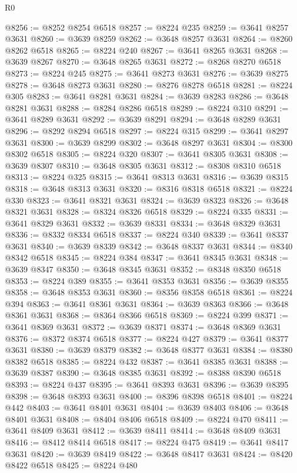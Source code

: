 \begin{lexlean}{R0}
\begin{coremodule}
@8256 := @8252 @8254 @6518
@8257 := @8224 @235
@8259 := @3641 @8257 @3631
@8260 := @3639 @8259
@8262 := @3648 @8257 @3631
@8264 := @8260 @8262 @6518
@8265 := @8224 @240
@8267 := @3641 @8265 @3631
@8268 := @3639 @8267
@8270 := @3648 @8265 @3631
@8272 := @8268 @8270 @6518
@8273 := @8224 @245
@8275 := @3641 @8273 @3631
@8276 := @3639 @8275
@8278 := @3648 @8273 @3631
@8280 := @8276 @8278 @6518
@8281 := @8224 @305
@8283 := @3641 @8281 @3631
@8284 := @3639 @8283
@8286 := @3648 @8281 @3631
@8288 := @8284 @8286 @6518
@8289 := @8224 @310
@8291 := @3641 @8289 @3631
@8292 := @3639 @8291
@8294 := @3648 @8289 @3631
@8296 := @8292 @8294 @6518
@8297 := @8224 @315
@8299 := @3641 @8297 @3631
@8300 := @3639 @8299
@8302 := @3648 @8297 @3631
@8304 := @8300 @8302 @6518
@8305 := @8224 @320
@8307 := @3641 @8305 @3631
@8308 := @3639 @8307
@8310 := @3648 @8305 @3631
@8312 := @8308 @8310 @6518
@8313 := @8224 @325
@8315 := @3641 @8313 @3631
@8316 := @3639 @8315
@8318 := @3648 @8313 @3631
@8320 := @8316 @8318 @6518
@8321 := @8224 @330
@8323 := @3641 @8321 @3631
@8324 := @3639 @8323
@8326 := @3648 @8321 @3631
@8328 := @8324 @8326 @6518
@8329 := @8224 @335
@8331 := @3641 @8329 @3631
@8332 := @3639 @8331
@8334 := @3648 @8329 @3631
@8336 := @8332 @8334 @6518
@8337 := @8224 @340
@8339 := @3641 @8337 @3631
@8340 := @3639 @8339
@8342 := @3648 @8337 @3631
@8344 := @8340 @8342 @6518
@8345 := @8224 @384
@8347 := @3641 @8345 @3631
@8348 := @3639 @8347
@8350 := @3648 @8345 @3631
@8352 := @8348 @8350 @6518
@8353 := @8224 @389
@8355 := @3641 @8353 @3631
@8356 := @3639 @8355
@8358 := @3648 @8353 @3631
@8360 := @8356 @8358 @6518
@8361 := @8224 @394
@8363 := @3641 @8361 @3631
@8364 := @3639 @8363
@8366 := @3648 @8361 @3631
@8368 := @8364 @8366 @6518
@8369 := @8224 @399
@8371 := @3641 @8369 @3631
@8372 := @3639 @8371
@8374 := @3648 @8369 @3631
@8376 := @8372 @8374 @6518
@8377 := @8224 @427
@8379 := @3641 @8377 @3631
@8380 := @3639 @8379
@8382 := @3648 @8377 @3631
@8384 := @8380 @8382 @6518
@8385 := @8224 @432
@8387 := @3641 @8385 @3631
@8388 := @3639 @8387
@8390 := @3648 @8385 @3631
@8392 := @8388 @8390 @6518
@8393 := @8224 @437
@8395 := @3641 @8393 @3631
@8396 := @3639 @8395
@8398 := @3648 @8393 @3631
@8400 := @8396 @8398 @6518
@8401 := @8224 @442
@8403 := @3641 @8401 @3631
@8404 := @3639 @8403
@8406 := @3648 @8401 @3631
@8408 := @8404 @8406 @6518
@8409 := @8224 @470
@8411 := @3641 @8409 @3631
@8412 := @3639 @8411
@8414 := @3648 @8409 @3631
@8416 := @8412 @8414 @6518
@8417 := @8224 @475
@8419 := @3641 @8417 @3631
@8420 := @3639 @8419
@8422 := @3648 @8417 @3631
@8424 := @8420 @8422 @6518
@8425 := @8224 @480

\end{coremodule}
\end{lexlean}
